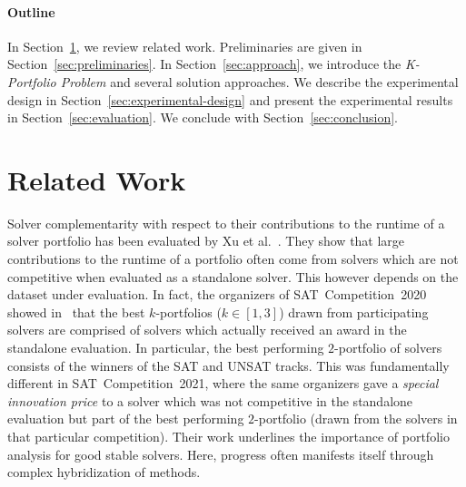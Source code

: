 \documentclass[conference]{IEEEtran}
\begin{document}
\paragraph{Outline}

In Section~\ref{sec:related-work}, we review related work. 
Preliminaries are given in Section~\ref{sec:preliminaries}. 
In Section~\ref{sec:approach}, we introduce the \emph{K-Portfolio Problem} and several solution approaches. 
We describe the experimental design in Section~\ref{sec:experimental-design} and present the experimental results in Section~\ref{sec:evaluation}. 
We conclude with Section~\ref{sec:conclusion}. 

\section{Related Work}
\label{sec:related-work}

Solver complementarity with respect to their contributions to the runtime of a solver portfolio has been evaluated by Xu et al.~\cite{Xu:2012:EvalContribVBS}. 
They show that large contributions to the runtime of a portfolio often come from solvers which are not competitive when evaluated as a standalone solver. 
This however depends on the dataset under evaluation. 
In fact, the organizers of SAT~Competition~2020 showed in~\cite{SC2020:AIJ} that the best $k$-portfolios ($k \in [1,3]$) drawn from participating solvers are comprised of solvers which actually received an award in the standalone evaluation.
In particular, the best performing $2$-portfolio of solvers consists of the winners of the SAT and UNSAT tracks. 
This was fundamentally different in SAT~Competition~2021, where the same organizers gave a \emph{special innovation price} to a solver which was not competitive in the standalone evaluation but part of the best performing $2$-portfolio (drawn from the solvers in that particular competition). %
Their work underlines the importance of portfolio analysis for good stable solvers. Here, progress often manifests itself through complex hybridization of methods. 
\end{document}
